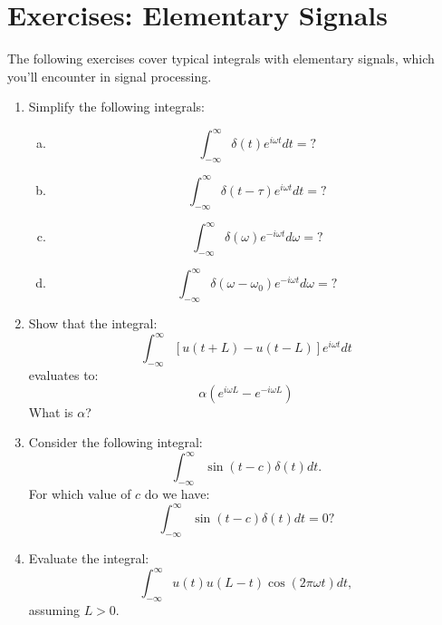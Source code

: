 \newpage
\section{Exercises: Elementary Signals}

The following exercises cover typical integrals with elementary signals, which you'll encounter in signal processing.

\begin{enumerate}
\item Simplify the following integrals:
  \begin{enumerate}[a)]
    \item
  \begin{equation*}
    \int_{-\infty}^{\infty} \delta(t)e^{i\omega t} dt = ?
  \end{equation*}
      \item

  \begin{equation*}
    \int_{-\infty}^{\infty} \delta(t-\tau)e^{i\omega t} dt = ?
    \end{equation*}
      \item
  \begin{equation*}
    \int_{-\infty}^{\infty} \delta(\omega)e^{-i\omega t} d\omega = ?
    \end{equation*}
      \item
  \begin{equation*}
    \int_{-\infty}^{\infty} \delta(\omega-\omega_0)e^{-i\omega t} d\omega = ?
  \end{equation*}
  \end{enumerate}
\item Show that the integral:
\begin{equation*}
    \int_{-\infty}^{\infty} [u(t+L)-u(t-L)]e^{i\omega t}dt
\end{equation*}
evaluates to:
\begin{equation*}
    \alpha (e^{i\omega L} - e^{-i\omega L})
\end{equation*}
What is $\alpha$?

\item Consider the following integral:
\begin{equation*}
    \int_{-\infty}^{\infty}\sin(t-c)\delta(t)dt.
\end{equation*}
For which value of $c$ do we have:
\begin{equation*}
    \int_{-\infty}^{\infty}\sin(t-c)\delta(t)dt=0?
\end{equation*}

\item Evaluate the integral:
\begin{equation*}
    \int_{-\infty}^{\infty}u(t)u(L-t)\cos(2\pi\omega t)dt,
\end{equation*}
assuming $L>0$. 


\end{enumerate}
